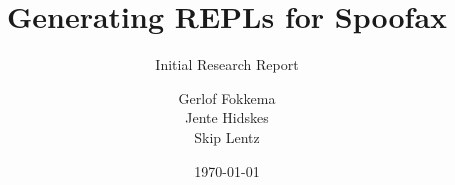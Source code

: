 \title{Generating REPLs for Spoofax}
\subtitle{Initial Research Report}
\author{%
Gerlof Fokkema\\
Jente Hidskes\\
Skip Lentz}
\date{\today}

